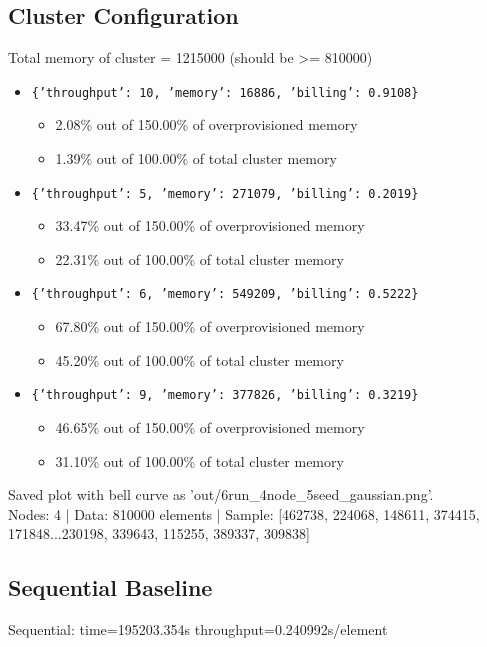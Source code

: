 \documentclass[]{interact}
\theoremstyle{plain}
\theoremstyle{definition}
\theoremstyle{remark}
\begin{document}
\subsection{Cluster Configuration}
Total memory of cluster = 1215000 (should be >= 810000)
\begin{itemize}
    \item \texttt{\{'throughput': 10, 'memory': 16886, 'billing': 0.9108\}}
    \begin{itemize}
        \item 2.08\% out of 150.00\% of overprovisioned memory
        \item 1.39\% out of 100.00\% of total cluster memory
    \end{itemize}
    \item \texttt{\{'throughput': 5, 'memory': 271079, 'billing': 0.2019\}}
    \begin{itemize}
        \item 33.47\% out of 150.00\% of overprovisioned memory
        \item 22.31\% out of 100.00\% of total cluster memory
    \end{itemize}
    \item \texttt{\{'throughput': 6, 'memory': 549209, 'billing': 0.5222\}}
    \begin{itemize}
        \item 67.80\% out of 150.00\% of overprovisioned memory
        \item 45.20\% out of 100.00\% of total cluster memory
    \end{itemize}
    \item \texttt{\{'throughput': 9, 'memory': 377826, 'billing': 0.3219\}}
    \begin{itemize}
        \item 46.65\% out of 150.00\% of overprovisioned memory
        \item 31.10\% out of 100.00\% of total cluster memory
    \end{itemize}
\end{itemize}
Saved plot with bell curve as 'out/6run\_4node\_5seed\_gaussian.png'.\\
Nodes: 4 | Data: 810000 elements | Sample: [462738, 224068, 148611, 374415, 171848...230198, 339643, 115255, 389337, 309838]

\subsection{Sequential Baseline}
Sequential: time=195203.354\textmu s throughput=0.240992\textmu s/element
\end{document}
